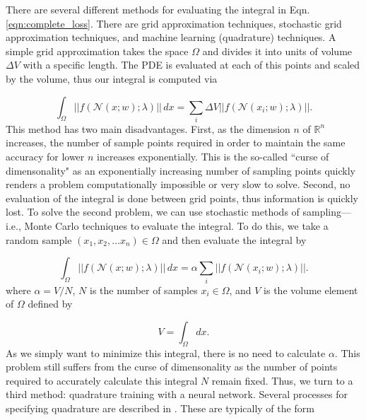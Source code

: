 \documentclass{CUP-JNL-DTM}%
\theoremstyle{definition}
\numberwithin{equation}{section}
\newcommand{\net}{\mathcal{N}}
\begin{document}
There are several different methods for evaluating the integral in Eqn. \ref{eqn:complete_loss}. There are grid approximation techniques, stochastic grid approximation techniques, and machine learning (quadrature) techniques. A simple grid approximation takes the space $\Omega$ and divides it into units of volume $\Delta V$ with a specific length. The PDE is evaluated at each of this points and scaled by the volume, thus our integral is computed via 

\begin{equation}
	\int_{\Omega} ||f(\net(x;w); \lambda)||\,dx = \sum_i \Delta V ||f(\net(x_i;w); \lambda)||.
\end{equation}
This method has two main disadvantages. First, as the dimension $n$ of $\mathbb{R}^n$ increases, the number of sample points required in order to maintain the same accuracy for lower $n$ increases exponentially. This is the so-called ``curse of dimensonality" as an exponentially increasing number of sampling points quickly renders a problem computationally impossible or very slow to solve. Second, no evaluation of the integral is done between grid points, thus information is quickly lost. To solve the second problem, we can use stochastic methods of sampling---i.e., Monte Carlo techniques to evaluate the integral. To do this, we take a random sample $(x_1, x_2, \dots x_n) \in \Omega$ and then evaluate the integral by

\begin{equation}
	\int_{\Omega} ||f(\net(x;w); \lambda)||\,dx = \alpha \sum_i ||f(\net(x_i;w); \lambda)||.
\end{equation}
where $\alpha = V/N$, $N$ is the number of samples $x_i \in \Omega$, and $V$ is the volume element of $\Omega$ defined by

\begin{equation}
    V = \int_{\Omega} dx. 
\end{equation}
As we simply want to minimize this integral, there is no need to calculate $\alpha$. This problem still suffers from the curse of dimensonality as the number of points required to accurately calculate this integral $N$ remain fixed. Thus, we turn to a third method: quadrature training with a neural network. Several processes for specifying quadrature are described in \cite{riveraQuadratureRulesSolving2022}. These are typically of the form 
\end{document}
